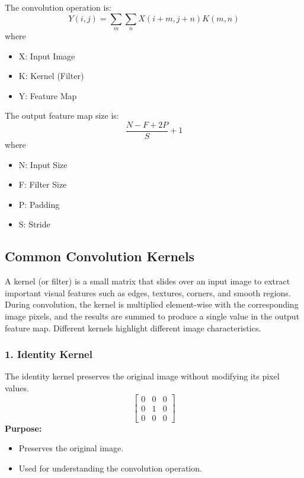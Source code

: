 \documentclass[11pt]{article}
\begin{document}
The convolution operation is: 
\begin{equation}
    Y(i,j) = \sum_{m}\sum_{n}X(i+m,j+n)K(m,n)
\end{equation}
where 
\begin{itemize}
    \item X: Input Image 
    \item K: Kernel (Filter) 
    \item Y: Feature Map 
\end{itemize}

The output feature map size is: 
\begin{equation}
    \frac{N-F+2P}{S}+1
\end{equation}
where 
\begin{itemize}
    \item N: Input Size 
    \item F: Filter Size 
    \item P: Padding 
    \item S: Stride 
\end{itemize}

\subsection{Common Convolution Kernels}
A kernel (or filter) is a small matrix that slides over an input image to extract important visual features such as edges, textures, corners, and smooth regions.  During convolution, the kernel is multiplied element-wise with the corresponding image pixels, and the results are summed to produce a single value in the output feature map.  Different kernels highlight different image characteristics. 

\subsubsection*{1. Identity Kernel}
The identity kernel preserves the original image without modifying its pixel values. 
$$ \begin{bmatrix} 0 & 0 & 0 \\ 0 & 1 & 0 \\ 0 & 0 & 0 \end{bmatrix} $$
\textbf{Purpose:}
\begin{itemize}
    \item Preserves the original image. 
    \item Used for understanding the convolution operation. 
\end{itemize}
\end{document}
